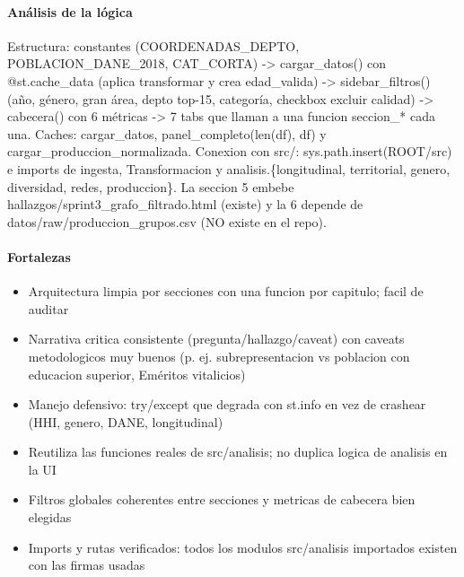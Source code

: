 \paragraph{Análisis de la lógica}
Estructura: constantes (COORDENADAS\_DEPTO, POBLACION\_DANE\_2018, CAT\_CORTA) -> cargar\_datos() con @st.cache\_data (aplica transformar y crea edad\_valida) -> sidebar\_filtros() (año, género, gran área, depto top-15, categoría, checkbox excluir calidad) -> cabecera() con 6 métricas -> 7 tabs que llaman a una funcion seccion\_* cada una. Caches: cargar\_datos, panel\_completo(len(df), df) y cargar\_produccion\_normalizada. Conexion con src/: sys.path.insert(ROOT/src) e imports de ingesta, Transformacion y analisis.\{longitudinal, territorial, genero, diversidad, redes, produccion\}. La seccion 5 embebe hallazgos/sprint3\_grafo\_filtrado.html (existe) y la 6 depende de datos/raw/produccion\_grupos.csv (NO existe en el repo).

\paragraph{Fortalezas}
\begin{itemize}
  \item Arquitectura limpia por secciones con una funcion por capitulo; facil de auditar
  \item Narrativa critica consistente (pregunta/hallazgo/caveat) con caveats metodologicos muy buenos (p. ej. subrepresentacion vs poblacion con educacion superior, Eméritos vitalicios)
  \item Manejo defensivo: try/except que degrada con st.info en vez de crashear (HHI, genero, DANE, longitudinal)
  \item Reutiliza las funciones reales de src/analisis; no duplica logica de analisis en la UI
  \item Filtros globales coherentes entre secciones y metricas de cabecera bien elegidas
  \item Imports y rutas verificados: todos los modulos src/analisis importados existen con las firmas usadas
\end{itemize}

